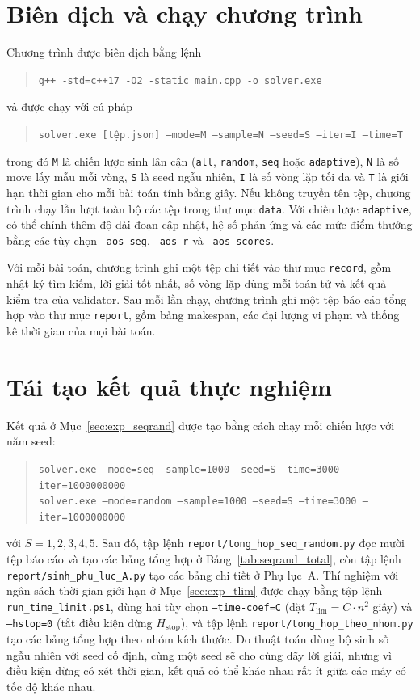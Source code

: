 \documentclass[../DoAn.tex]{subfiles}
\begin{document}
\section{Biên dịch và chạy chương trình}

Chương trình được biên dịch bằng lệnh
\begin{quote}
\texttt{g++ -std=c++17 -O2 -static main.cpp -o solver.exe}
\end{quote}
và được chạy với cú pháp
\begin{quote}
\texttt{solver.exe [tệp.json] --mode=M --sample=N --seed=S --iter=I --time=T}
\end{quote}
trong đó \texttt{M} là chiến lược sinh lân cận (\texttt{all}, \texttt{random}, \texttt{seq} hoặc \texttt{adaptive}), \texttt{N} là số move lấy mẫu mỗi vòng, \texttt{S} là seed ngẫu nhiên, \texttt{I} là số vòng lặp tối đa và \texttt{T} là giới hạn thời gian cho mỗi bài toán tính bằng giây. Nếu không truyền tên tệp, chương trình chạy lần lượt toàn bộ các tệp trong thư mục \texttt{data}. Với chiến lược \texttt{adaptive}, có thể chỉnh thêm độ dài đoạn cập nhật, hệ số phản ứng và các mức điểm thưởng bằng các tùy chọn \texttt{--aos-seg}, \texttt{--aos-r} và \texttt{--aos-scores}.

Với mỗi bài toán, chương trình ghi một tệp chi tiết vào thư mục \texttt{record}, gồm nhật ký tìm kiếm, lời giải tốt nhất, số vòng lặp dùng mỗi toán tử và kết quả kiểm tra của validator. Sau mỗi lần chạy, chương trình ghi một tệp báo cáo tổng hợp vào thư mục \texttt{report}, gồm bảng makespan, các đại lượng vi phạm và thống kê thời gian của mọi bài toán.

\section{Tái tạo kết quả thực nghiệm}

Kết quả ở Mục~\ref{sec:exp_seqrand} được tạo bằng cách chạy mỗi chiến lược với năm seed:
\begin{quote}
\texttt{solver.exe --mode=seq --sample=1000 --seed=S --time=3000 --iter=1000000000}\\
\texttt{solver.exe --mode=random --sample=1000 --seed=S --time=3000 --iter=1000000000}
\end{quote}
với $S = 1, 2, 3, 4, 5$. Sau đó, tập lệnh \texttt{report/tong\_hop\_seq\_random.py} đọc mười tệp báo cáo và tạo các bảng tổng hợp ở Bảng~\ref{tab:seqrand_total}, còn tập lệnh \texttt{report/sinh\_phu\_luc\_A.py} tạo các bảng chi tiết ở Phụ lục~A. Thí nghiệm với ngân sách thời gian giới hạn ở Mục~\ref{sec:exp_tlim} được chạy bằng tập lệnh \texttt{run\_time\_limit.ps1}, dùng hai tùy chọn \texttt{--time-coef=C} (đặt $T_{\text{lim}} = C \cdot n^2$ giây) và \texttt{--hstop=0} (tắt điều kiện dừng $H_{\text{stop}}$), và tập lệnh \texttt{report/tong\_hop\_theo\_nhom.py} tạo các bảng tổng hợp theo nhóm kích thước. Do thuật toán dùng bộ sinh số ngẫu nhiên với seed cố định, cùng một seed sẽ cho cùng dãy lời giải, nhưng vì điều kiện dừng có xét thời gian, kết quả có thể khác nhau rất ít giữa các máy có tốc độ khác nhau.
\end{document}
